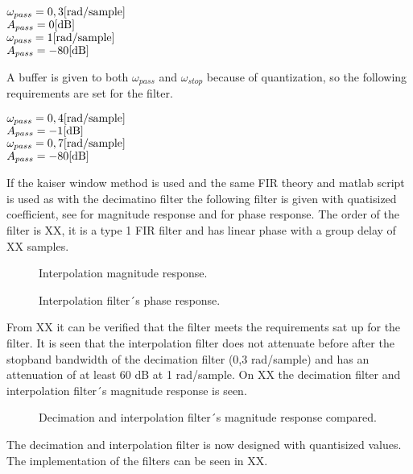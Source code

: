 $\omega_{pass}=0,3 \enhed{rad/sample}$\\
$A_{pass}=0 \enhed{dB}$\\
$\omega_{pass}=1 \enhed{rad/sample}$\\
$A_{pass}=-80 \enhed{dB}$

A buffer is given to both $\omega_{pass}$ and $\omega_{stop}$ because of quantization, so the following requirements are set for the filter.

$\omega_{pass}=0,4 \enhed{rad/sample}$\\
$A_{pass}=-1 \enhed{dB}$\\
$\omega_{pass}=0,7 \enhed{rad/sample}$\\
$A_{pass}=-80 \enhed{dB}$

 If the kaiser window method is used and the same FIR theory and matlab script is used as with the decimatino filter the following filter is given with quatisized coefficient, see for magnitude response and for phase response. The order of the filter is XX, it is a type 1 FIR filter and has linear phase with a group delay of XX samples.

\begin{figure}[H]
	\centering
	
	\caption{Interpolation magnitude response.}
	\label{fig:IntMag}
\end{figure}

\begin{figure}[H]
	\centering
	
	\caption{Interpolation filter´s phase response.}
	\label{fig:IntPhase}
\end{figure}

From XX it can be verified that the filter meets the requirements sat up for the filter. It is seen that the interpolation filter does not attenuate before after the stopband bandwidth of the decimation filter (0,3 rad/sample) and has an attenuation of at least 60 dB at 1 rad/sample. On XX the decimation filter and interpolation filter´s magnitude response is seen.  

\begin{figure}[H]
	\centering
	
	\caption{Decimation and interpolation filter´s magnitude response compared.}
	\label{fig:decIntComp}
\end{figure}


The decimation and interpolation filter is now designed with quantisized values. The implementation of the filters can be seen in XX.    